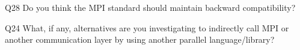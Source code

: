 \begin{description}%
\item{Q28} Do you think the MPI standard should maintain backward compatibility?%
\item{Q24} What, if any, alternatives are you investigating to indirectly call MPI or another communication layer by using another parallel language/library?%
\end{description}%
